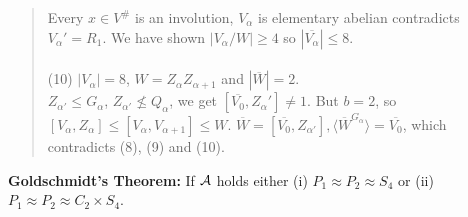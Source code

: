 \begin{quote}
Every $x \in V^{\#}$ is an involution, $V_{\alpha}$ is elementary abelian contradicts ${V_{\alpha}}' = R_1$.
We have shown $|V_{\alpha}/ W| \geq 4$ so  $|{\overline {V_{\alpha}}}| \leq 8$. \\
\\
(10) $|V_{\alpha}|=8$, $W = Z_{\alpha}Z_{\alpha + 1}$ and $|{\overline W}|=2$.\\
$Z_{\alpha'} \leq G_{\alpha}$, $Z_{\alpha'} \nleq Q_{\alpha}$,
we get $[{\overline {V_0}}, Z_{\alpha}'] \ne 1$.  But $b = 2$,
so $[V_{\alpha}, Z_{\alpha}] \leq [V_{\alpha}, V_{\alpha + 1}] \leq W$.
${\overline W} = [{\overline {V_0}}, Z_{\alpha'}], \langle {\overline W}^{G_{\alpha}} \rangle = {\overline {V_0}}$, which
contradicts (8), (9) and (10).
\end{quote}
{\bf Goldschmidt's Theorem:}
If ${\cal A}$ holds either (i) $P_1 \approx P_2 \approx S_4$ or 
(ii) $P_1 \approx P_2 \approx C_2 \times S_4$.
